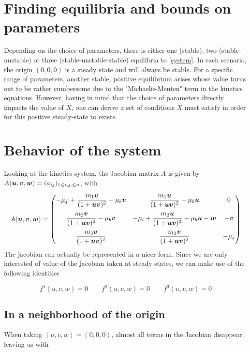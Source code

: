 \section{Finding equilibria and bounds on parameters}

Depending on the choice of parameters, there is either one (stable), two (stable-unstable) or three (stable-unstable-stable) equilibria to \ref{system}. In each scenario, the origin $(0, 0, 0)$ is a steady state and will always be stable. For a specific range of parameters, another stable, positive equilibrium arises whose value turns out to be rather cumbersome due to the "Michaelis-Menten" term in the kinetics equations. However, having in mind that the choice of parameters directly impacts the value of $\bar X$, one can derive a set of conditions $\bar X$ must satisfy in order for this positive steady-state to exists.

\section{Behavior of the system}

Looking at the kinetics system, the Jacobian matrix $A$ is given by $A(\bm{u}, \bm{v}, \bm{w}) = (a_{ij})_{1 \le i, j, \le n}$, with

$$
A(\bm{u}, \bm{v}, \bm{w}) = \begin{pmatrix}  -\mu_f +  \dfrac{m_1\bm{v}}{(1+\bm{u} \bm{v})^2} - \mu_b \bm{v} &  \dfrac{m_1 \bm{u}}{(1+\bm{u} \bm{v})^2} - \mu_b \bm{u} & 0 \\[1.2em]
 \dfrac{m_2 \bm{v}}{(1+\bm{u} \bm{v})^2} - \mu_b \bm{v}   & -\mu_l + \dfrac{m_2 \bm{u}}{(1+\bm{u} \bm{v})^2} - \mu_b \bm{u} - \bm{w}  & -\bm{v} \\[1.2em] 
  \dfrac{m_3 \bm{v}}{(1+\bm{u} \bm{v})^2} &  \dfrac{m_3 \bm{v}}{(1+\bm{u} \bm{v})^2} & -\mu_e \end{pmatrix}
$$
The jacobian can actually be represented in a nicer form. Since we are only interested of value of the jacobian taken at steady states, we can make use of the following identities 

\begin{equation}
	\label{identities}
	 f^1(u, v, w) = 0 \quad\quad f^2(u, v, w) = 0 \quad\quad f^3(u, v, w) = 0
\end{equation}


\subsection{In a neighborhood of the origin}

When taking $(u, v, w) = (0, 0, 0)$, almost all terms in the Jacobian disappear, leaving us with

